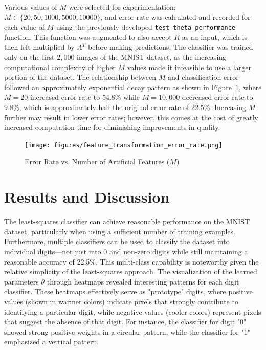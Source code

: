 \documentclass[conference]{IEEEtran}
\begin{document}
Various values of $M$ were selected for experimentation: $M \in \{20, 50, 1000, 5000, 10000\}$, and error rate was calculated and recorded for each value of $M$ using the previously developed \texttt{test\_theta\_performance} function. This function was augmented to also accept $R$ as an input, which is then left-multiplied by $A^T$ before making predictions. The classifier was trained only on the first $2,000$ images of the MNIST dataset, as the increasing computational complexity of higher $M$ values made it infeasible to use a larger portion of the dataset. The relationship between $M$ and classification error followed an approximately exponential decay pattern as shown in Figure~\ref{fig:feature_transformation_error_rate}, where $M=20$ increased error rate to 54.8\% while $M = 10,000$ decreased error rate to 9.8\%, which is approximately half the original error rate of 22.5\%. Increasing $M$ further may result in lower error rates; however, this comes at the cost of greatly increased computation time for diminishing improvements in quality.

\begin{figure}[htbp]
  \centerline{\texttt{[image: figures/feature\_transformation\_error\_rate.png]}}
  \caption{Error Rate vs. Number of Artificial Features ($M$)}
  \label{fig:feature_transformation_error_rate}
\end{figure}  

\section{Results and Discussion}
The least-squares classifier can achieve reasonable performance on the MNIST dataset, particularly when using a sufficient number of training examples. Furthermore, multiple classifiers can be used to classify the dataset into individual digits---not just into 0 and non-zero digits while still maintaining a reasonable accuracy of 22.5\%. This multi-class capability is noteworthy given the relative simplicity of the least-squares approach. The visualization of the learned parameters $\theta$ through heatmaps revealed interesting patterns for each digit classifier. These heatmaps effectively serve as "prototype" digits, where positive values (shown in warmer colors) indicate pixels that strongly contribute to identifying a particular digit, while negative values (cooler colors) represent pixels that suggest the absence of that digit. For instance, the classifier for digit "0" showed strong positive weights in a circular pattern, while the classifier for "1" emphasized a vertical pattern.
\end{document}
